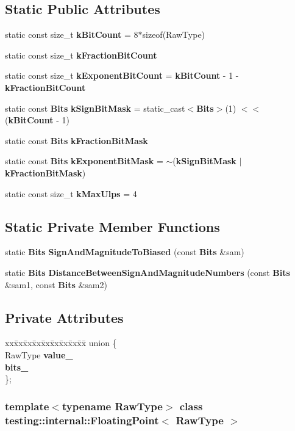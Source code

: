 \subsection*{Static Public Attributes}
\begin{CompactItemize}
\item 
static const size\_\-t {\bf kBitCount} = 8$\ast$sizeof(RawType)
\item 
static const size\_\-t {\bf kFractionBitCount}
\item 
static const size\_\-t {\bf kExponentBitCount} = {\bf kBitCount} - 1 - {\bf kFractionBitCount}
\item 
static const {\bf Bits} {\bf kSignBitMask} = static\_\-cast$<${\bf Bits}$>$(1) $<$$<$ ({\bf kBitCount} - 1)
\item 
static const {\bf Bits} {\bf kFractionBitMask}
\item 
static const {\bf Bits} {\bf kExponentBitMask} = $\sim$({\bf kSignBitMask} $|$ {\bf kFractionBitMask})
\item 
static const size\_\-t {\bf kMaxUlps} = 4
\end{CompactItemize}
\subsection*{Static Private Member Functions}
\begin{CompactItemize}
\item 
static {\bf Bits} {\bf SignAndMagnitudeToBiased} (const {\bf Bits} \&sam)
\item 
static {\bf Bits} {\bf DistanceBetweenSignAndMagnitudeNumbers} (const {\bf Bits} \&sam1, const {\bf Bits} \&sam2)
\end{CompactItemize}
\subsection*{Private Attributes}
\begin{CompactItemize}
\item 
\begin{tabbing}
xx\=xx\=xx\=xx\=xx\=xx\=xx\=xx\=xx\=\kill
union \{\\
\>RawType {\bf value\_}\\
 {\bf bits\_}\\
\}; \\

\end{tabbing}\end{CompactItemize}
\subsubsection*{template$<$typename RawType$>$ class testing::internal::FloatingPoint$<$ RawType $>$}



